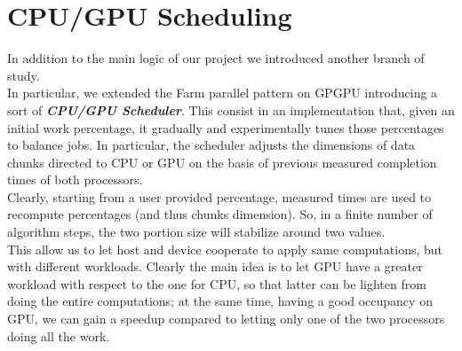 \section{CPU/GPU Scheduling}
In addition to the main logic of our project we introduced another branch of study.\\
In particular, we extended the Farm parallel pattern on GPGPU introducing a sort of \textit{\textbf{CPU/GPU Scheduler}}.
This consist in an implementation that, given an initial work percentage, it gradually and experimentally tunes those percentages to balance jobs.
In particular, the scheduler adjusts the dimensions of data chunks directed to CPU or GPU on the basis of previous measured completion times of both processors.\\
Clearly, starting from a user provided percentage, measured times are used to recompute percentages (and thus chunks dimension). So, in a finite number of algorithm steps, the two portion size will stabilize around two values.\\
This allow us to let host and device cooperate to apply same computations, but with different workloads. Clearly the main idea is to let GPU have a greater workload with respect to the one for CPU, so that  latter can be lighten from doing the entire computations; at the same time, having a good occupancy on GPU, we can gain a speedup compared to letting only one of the two processors doing all the work.\\


